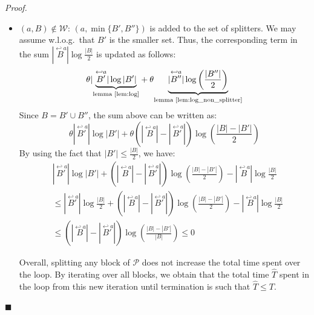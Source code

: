 \documentclass[12pt, a4 paper]{article}
\renewenvironment{proof}[1][Proof]{\begin{mdframed}[backgroundcolor=black!5, topline=false, rightline=false, bottomline=false, linecolor=black!15, linewidth=3pt]{\noindent\textit{#1.}\ }}{\noindent\par\hfill$\blacksquare$\end{mdframed}}
\theoremstyle{definition}
\begin{document}
\begin{proof}
\begin{itemize}
        \item $(a, B) \notin \mathcal{W}$: $(a, \min\{B', B''\})$ is added to the set of splitters. We may assume w.l.o.g.\ that $B'$ is the smaller set.
        Thus, the corresponding term in the sum $|\overset{\hookleftarrow a}{B}| \log \frac{| B |}{2}$ is updated as follows:
        \begin{equation*}
            \theta | \underset{\text{lemma \ref{lem:log}}}{\underbrace{\overset{\hookleftarrow a}{B'} | \log | B' |}} + \theta \underset{\text{lemma \ref{lem:log_non_splitter}}}{\underbrace{|\overset{\hookleftarrow a}{B''} | \log \left(\frac{| B'' |}{2}\right)}}
        \end{equation*}
        Since $B = B' \cup B''$, the sum above can be written as:
        \begin{equation*}
            \theta | \overset{\hookleftarrow a}{B'} | \log | B' | + \theta (| \overset{\hookleftarrow a}{B} | - | \overset{\hookleftarrow a}{B'} |) \log \left(\frac{|B|-|B'|}{2}\right)
        \end{equation*}
        By using the fact that $\displaystyle{| B' | \leq \frac{|B|}{2}}$, we have:
        \begin{align*}
            & | \overset{\hookleftarrow a}{B'} | \log | B'| + (| \overset{\hookleftarrow a}{B} | - | \overset{\hookleftarrow a}{B'}|)\log \left(\frac{| B | - |B'|}{2} \right) - |\overset{\hookleftarrow a}{B}| \log \frac{|B|}{2} \\
            & \leq | \overset{\hookleftarrow a}{B'}| \log \frac{| B |}{2} + (| \overset{\hookleftarrow a}{B}| - | \overset{\hookleftarrow a}{B'}|) \log \left(\frac{|B| - |B'|}{2}\right) - | \overset{\hookleftarrow a}{B}| \log \frac{| B |}{2} \\
            & \leq (| \overset{\hookleftarrow a}{B}| - | \overset{\hookleftarrow a}{B'} |) \log \left(\frac{| B | - | B' |}{| B |}\right) \leq 0
        \end{align*}

        Overall, splitting any block of $\mathcal{P}$ does not increase the total time spent over the loop.
        By iterating over all blocks, we obtain that the total time $\hat{T}$ spent in the loop from this new iteration until termination is such that $\hat{T} \leq T$.
    \end{itemize}
\end{proof}

\bigskip
\end{document}
